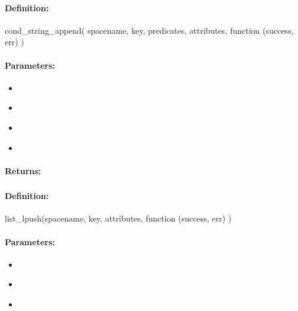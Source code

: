 \paragraph{Definition:}
\begin{javascriptcode}
cond_string_append(
        spacename, key, predicates, attributes, function (success, err) {})
\end{javascriptcode}
\paragraph{Parameters:}
\begin{itemize}[noitemsep]
\item {}\\

\item {}\\

\item {}\\

\item {}\\

\end{itemize}

\paragraph{Returns:}


\pagebreak
\subsubsection{}
\label{api:nodejs:list_lpush}


\paragraph{Definition:}
\begin{javascriptcode}
list_lpush(spacename, key, attributes, function (success, err) {})
\end{javascriptcode}
\paragraph{Parameters:}
\begin{itemize}[noitemsep]
\item {}\\

\item {}\\

\item {}\\

\end{itemize}

